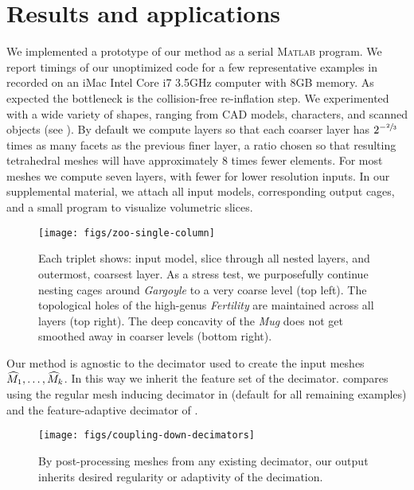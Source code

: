 \section{Results and applications}
\label{sec:results}

We implemented a prototype of our method as a serial \textsc{Matlab} program.
%
We report timings of our unoptimized code for a few representative examples in
 recorded on an iMac Intel Core i7 3.5GHz computer with 8GB
memory.
%
As expected the bottleneck is the collision-free re-inflation step.
%
We experimented with a wide variety of shapes, ranging from CAD models,
characters, and scanned objects (see ). By default we compute
layers so that each coarser layer has $2^{-\sfrac{2}{3}}$ times as many facets as
the previous finer layer, a ratio chosen so that resulting tetrahedral
meshes will have approximately $8$ times fewer elements. For most
meshes we compute seven layers, with fewer for lower resolution inputs.
%
In our supplemental material, we attach all input models, corresponding output
cages, and a small program to visualize volumetric slices.

\begin{figure}
  \texttt{[image: figs/zoo-single-column]}
  \caption{Each triplet shows: input model, slice through all nested layers,
  and outermost, coarsest layer. 
  As a stress test, we purposefully continue nesting cages around \emph{Gargoyle} to a
  very coarse level (top left).
  The topological holes of the high-genus \emph{Fertility} are maintained
  across all layers (top right). 
  The deep concavity of the \emph{Mug} does not
  get smoothed away in coarser levels (bottom right).
  }
  \label{fig:zoo}
  \vspace{-2mm}
\end{figure}



Our method is agnostic to the decimator used to create the input meshes
$\widehat{M}_1,\dots,\widehat{M}_k$. In this way we inherit the feature set of the
decimator. 
%
compares using the regular mesh inducing decimator in \cite{cgal} (default for
all remaining examples) and the feature-adaptive decimator of \cite{openmesh}.

\begin{figure}
  \texttt{[image: figs/coupling-down-decimators]}
  \caption{By post-processing meshes from any existing decimator, our output
  inherits desired regularity or adaptivity of the decimation.}
  \label{fig:decimations}
\end{figure}

